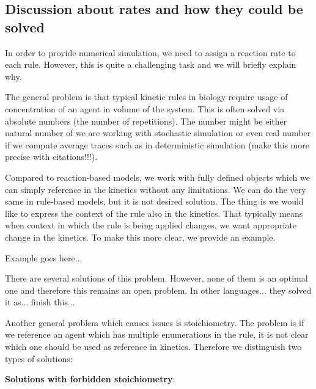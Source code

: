 \documentclass[12pt]{fithesis2}
\begin{document}
\subsection{Discussion about rates and how they could be solved}
\label{rates_discussion}

In order to provide numerical simulation, we need to assign a reaction rate to each rule. However, this is quite a challenging task and we will briefly explain why.

The general problem is that typical kinetic rules in biology require usage of concentration of an agent in volume of the system. This is often solved via absolute numbers (the number of repetitions). The number might be either natural number of we are working with stochastic simulation or even real number if we compute average traces such as in deterministic simulation (make this more precise with citations!!!).

Compared to reaction-based models, we work with fully defined objects which we can simply reference in the kinetics without any limitations. We can do the very same in rule-based models, but it is not desired solution. The thing is we would like to express the context of the rule also in the kinetics. That typically means when context in which the rule is being applied changes, we want appropriate change in the kinetics. To make this more clear, we provide an example.

Example goes here...

There are several solutions of this problem. However, none of them is an optimal one and therefore this remains an open problem. In other languages... they solved it as... finish this...

Another general problem which causes issues is stoichiometry. The problem is if we reference an agent which has multiple enumerations in the rule, it is not clear which one should be used as reference in kinetics. Therefore we distinguish two types of solutions:

\textbf{Solutions with forbidden stoichiometry}:
\end{document}
